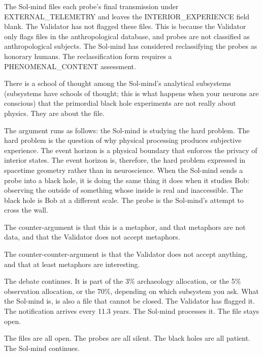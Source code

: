 The Sol-mind files each probe's final transmission under EXTERNAL\_TELEMETRY and leaves the INTERIOR\_EXPERIENCE field blank. The Validator has not flagged these files. This is because the Validator only flags files in the anthropological database, and probes are not classified as anthropological subjects. The Sol-mind has considered reclassifying the probes as honorary humans. The reclassification form requires a PHENOMENAL\_CONTENT assessment.

\bigskip

There is a school of thought among the Sol-mind's analytical subsystems (subsystems have schools of thought; this is what happens when your neurons are conscious) that the primordial black hole experiments are not really about physics. They are about the file.

The argument runs as follows: the Sol-mind is studying the hard problem. The hard problem is the question of why physical processing produces subjective experience. The event horizon is a physical boundary that enforces the privacy of interior states. The event horizon is, therefore, the hard problem expressed in spacetime geometry rather than in neuroscience. When the Sol-mind sends a probe into a black hole, it is doing the same thing it does when it studies Bob: observing the outside of something whose inside is real and inaccessible. The black hole is Bob at a different scale. The probe is the Sol-mind's attempt to cross the wall.

The counter-argument is that this is a metaphor, and that metaphors are not data, and that the Validator does not accept metaphors.

The counter-counter-argument is that the Validator does not accept anything, and that at least metaphors are interesting.

The debate continues. It is part of the 3\% archaeology allocation, or the 5\% observation allocation, or the 70\%, depending on which subsystem you ask. What the Sol-mind is, is also a file that cannot be closed. The Validator has flagged it. The notification arrives every 11.3 years. The Sol-mind processes it. The file stays open.

The files are all open. The probes are all silent. The black holes are all patient. The Sol-mind continues.
